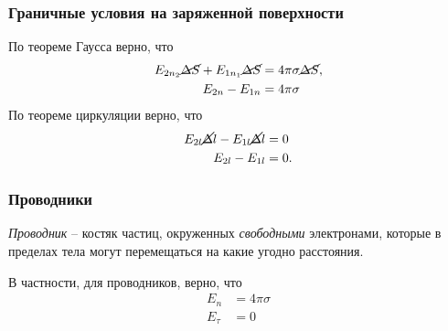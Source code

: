 \subsubsection*{Граничные условия на заряженной поверхности}

\vspace{-10pt}

\begin{minipage}[c]{0.45\textwidth}
\noindent
    По теореме Гаусса верно, что
    \begin{align*}
        E_{2n_2} \cancel{\Delta S} + E_{1n_1} \cancel{\Delta S} &= 4\pi\sigma \cancel{\Delta S}, \\
        E_{2n} - E_{1n} &= 4\pi\sigma
    \end{align*}
\noindent
    По теореме циркуляции верно, что
    \begin{align*}
        E_{2l} \cancel{\Delta} l - E_{1l} \cancel{\Delta} l &= 0 \\
        E_{2l} - E_{1l} &= 0.
    \end{align*}
\end{minipage}
\hfill
\begin{minipage}[c]{0.45\textwidth}
\end{minipage}

\vspace{-10pt}

\subsubsection*{Проводники}

\begin{to_def}
    \textit{Проводник} -- костяк частиц, окруженных \textit{свободными} электронами, которые в пределах тела могут перемещаться на какие угодно
    расстояния. 
\end{to_def}

\vspace{-10pt}

\begin{minipage}[c]{0.55\textwidth}
    В частности, для проводников, верно, что
    \begin{align*}
        E_n &= 4 \pi \sigma \\
        E_\tau &= 0
    \end{align*}
\end{minipage}
\hfill
\begin{minipage}[c]{0.35\textwidth}
\end{minipage}

